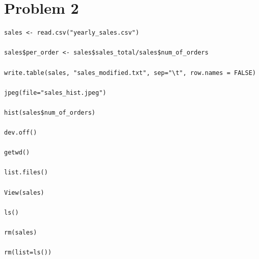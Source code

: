 \documentclass{article}
\begin{document}
\begin{figure}[H]
    \centering
\end{figure}



\section{Problem 2}
\begin{lstlisting}
sales <- read.csv("yearly_sales.csv")

sales$per_order <- sales$sales_total/sales$num_of_orders

write.table(sales, "sales_modified.txt", sep="\t", row.names = FALSE)

jpeg(file="sales_hist.jpeg")

hist(sales$num_of_orders)

dev.off()

getwd()

list.files()

View(sales)

ls()

rm(sales)

rm(list=ls())

\end{lstlisting}
\end{document}
